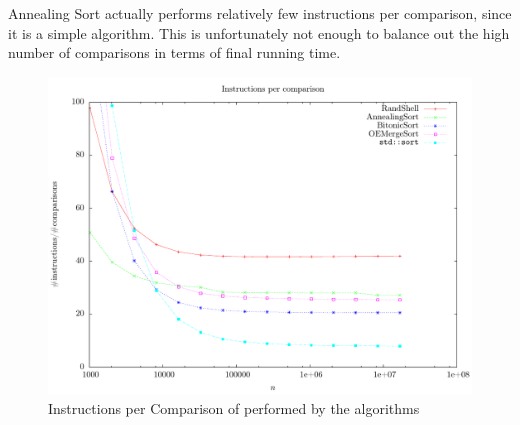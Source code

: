 Annealing Sort actually performs relatively few instructions per comparison, since it is a simple algorithm. This is unfortunately not enough to balance out the high number of comparisons in terms of final running time.

\begin{figure}
\center
\includegraphics[width=\textwidth]{graphs/Performance/instructionscomparison.pdf}
\caption{Instructions per Comparison of performed by the algorithms}
\label{fig:Performance:instructions:comparisons}
\end{figure}

